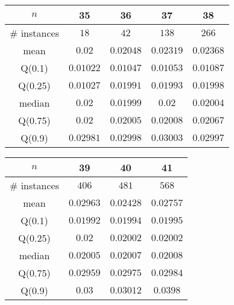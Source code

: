 \begin{tabular}{c|cccc} 
\hline 
$n$ & 35 & 36 & 37 & 38 \tabularnewline 
\hline 
\hline 
\# instances & $18$ & $42$ & $138$ & $266$ \tabularnewline 
mean & $0.02$ & $0.02048$ & $0.02319$ & $0.02368$ \tabularnewline 
Q(0.1) & $0.01022$ & $0.01047$ & $0.01053$ & $0.01087$ \tabularnewline 
Q(0.25) & $0.01027$ & $0.01991$ & $0.01993$ & $0.01998$ \tabularnewline 
median & $0.02$ & $0.01999$ & $0.02$ & $0.02004$ \tabularnewline 
Q(0.75) & $0.02$ & $0.02005$ & $0.02008$ & $0.02067$ \tabularnewline 
Q(0.9) & $0.02981$ & $0.02998$ & $0.03003$ & $0.02997$ \tabularnewline 
\hline 
\end{tabular} 
\medskip{} 

\begin{tabular}{c|ccc} 
\hline 
$n$ & 39 & 40 & 41 \tabularnewline 
\hline 
\hline 
\# instances & $406$ & $481$ & $568$ \tabularnewline 
mean & $0.02963$ & $0.02428$ & $0.02757$ \tabularnewline 
Q(0.1) & $0.01992$ & $0.01994$ & $0.01995$ \tabularnewline 
Q(0.25) & $0.02$ & $0.02002$ & $0.02002$ \tabularnewline 
median & $0.02005$ & $0.02007$ & $0.02008$ \tabularnewline 
Q(0.75) & $0.02959$ & $0.02975$ & $0.02984$ \tabularnewline 
Q(0.9) & $0.03$ & $0.03012$ & $0.0398$ \tabularnewline 
\hline 
\end{tabular} 
\medskip{} 

